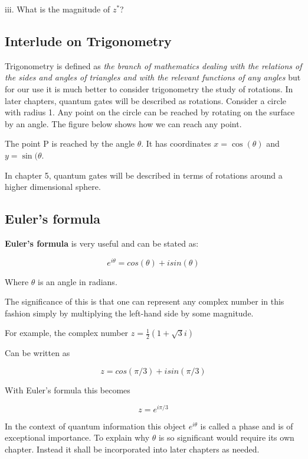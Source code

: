 \documentclass{book}
\begin{document}
iii. What is the magnitude of $z^*$?
\hline
\subsection{ Interlude on Trigonometry } 

Trigonometry is defined as \textit{the branch of mathematics dealing with the relations of the sides and angles of triangles and with the relevant functions of any angles} but for our use it is much better to consider trigonometry the study of rotations. In later chapters, quantum gates will be described as rotations. Consider a circle with radius 1. Any point on the circle can be reached by rotating on the surface by an angle. The figure below shows how we can reach any point.


The point P is reached by the angle $ \theta $. It has coordinates $ x = \cos(\theta) $ and $ y = \sin(\theta $.

In chapter 5, quantum gates will be described in terms of rotations around a higher dimensional sphere. 

\subsection{ Euler's formula}

\textbf{Euler's formula} is very useful and can be stated as:

$$ e^{i \theta} = cos(\theta) + i sin(\theta) $$

Where $\theta$ is an angle in radians. 

The significance of this is that one can represent any complex number in this fashion simply by multiplying the left-hand side by some magnitude. 

For example, the complex number $ z = \frac{1}{2}( 1 + \sqrt{3}i)$ 

Can be written as 

$$ z = cos(\pi/3) + i sin(\pi/3) $$

With Euler's formula this becomes 

$$ z = e^{i \pi/3} $$

In the context of quantum information this object $ e^{i\theta}$ is called a phase and is of exceptional importance. To explain why $\theta$ is so significant would require its own chapter. Instead it shall be incorporated into later chapters as needed.
\end{document}

